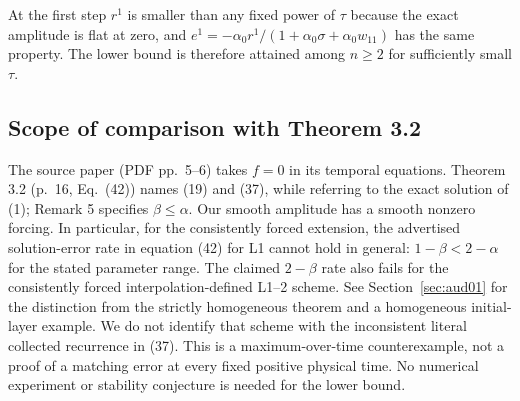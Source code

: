 \documentclass[11pt,a4paper]{amsart}
\theoremstyle{remark}
\theoremstyle{plain}
\theoremstyle{remark}
\numberwithin{equation}{section}
\begin{document}
At the first step $r^1$ is smaller than any fixed power of $\tau$ because the exact amplitude is flat at zero, and $e^1=-\alpha_0 r^1/(1+\alpha_0\sigma+\alpha_0w_{11})$ has the same property. The lower bound is therefore attained among $n\ge2$ for sufficiently small $\tau$. \subsection{Scope of comparison with Theorem 3.2}
The source paper (PDF pp.~5--6) takes $f=0$ in its temporal equations. Theorem 3.2 (p.~16, Eq.~(42)) names (19) and (37), while referring to the exact solution of (1); Remark 5 specifies $\beta\le\alpha$. Our smooth amplitude has a smooth nonzero forcing. In particular, for the consistently forced extension, the advertised solution-error rate in equation (42) for L1 cannot hold in general: $1-\beta<2-\alpha$ for the stated parameter range. The claimed $2-\beta$ rate also fails for the consistently forced interpolation-defined L1--2 scheme. See Section~\ref{sec:aud01} for the distinction from the strictly homogeneous theorem and a homogeneous initial-layer example. We do not identify that scheme with the inconsistent literal collected recurrence in (37). This is a maximum-over-time counterexample, not a proof of a matching error at every fixed positive physical time. No numerical experiment or stability conjecture is needed for the lower bound.
\end{document}
